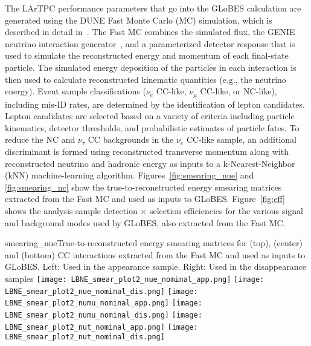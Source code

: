 The LArTPC performance parameters that go into the GLoBES calculation
are generated using the DUNE Fast Monte Carlo (MC) simulation, which
is described in detail in~\cite{Adams:2013qkq}.  The Fast MC combines
the simulated flux, the GENIE neutrino interaction
generator~\cite{Andreopoulos:2009rq}, and a parameterized detector
response that is used to simulate the reconstructed energy and
momentum of each final-state particle.  The simulated energy
deposition of the particles in each interaction is then used to
calculate reconstructed kinematic quantities (e.g., the neutrino
energy). Event sample classifications ($\nu_e$ CC-like, $\nu_{\mu}$
CC-like, or NC-like), including mis-ID rates, are determined by the
identification of lepton candidates. Lepton candidates are selected
based on a variety of criteria including particle kinematics,
detector thresholds, and probabilistic estimates of particle fates. To
reduce the NC and $\nu_{\tau}$ CC backgrounds in the $\nu_e$ CC-like
sample, an additional discriminant is formed using reconstructed
transverse momentum along with reconstructed neutrino and hadronic
energy as inputs to a k-Nearest-Neighbor (kNN) machine-learning
algorithm.  Figures~\ref{fig:smearing_nue} and \ref{fig:smearing_nc} show
the true-to-reconstructed energy smearing matrices extracted from the
Fast MC and used as inputs to GLoBES.  Figure~\ref{fig:eff} shows the
analysis sample detection $\times$ selection efficiencies for the
various signal and background modes used by GLoBES, also extracted
from the Fast MC.

\begin{cdrfigure}{smearing_nue}{True-to-reconstructed energy smearing matrices for \nue (top), \numu (center) and \nutau (bottom) CC interactions extracted from the Fast MC and used as inputs to GLoBES.  Left: Used in the \nue appearance sample. Right: Used in the \numu disappearance samples}
 \texttt{[image: LBNE\_smear\_plot2\_nue\_nominal\_app.png]}
\texttt{[image: LBNE\_smear\_plot2\_nue\_nominal\_dis.png]}
 \texttt{[image: LBNE\_smear\_plot2\_numu\_nominal\_app.png]}
\texttt{[image: LBNE\_smear\_plot2\_numu\_nominal\_dis.png]}
 \texttt{[image: LBNE\_smear\_plot2\_nut\_nominal\_app.png]}
 \texttt{[image: LBNE\_smear\_plot2\_nut\_nominal\_dis.png]}
\end{cdrfigure}

